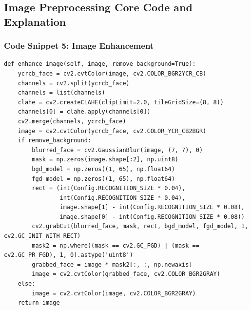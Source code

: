 \documentclass{article}
\begin{document}
\subsection{Image Preprocessing Core Code and Explanation}

\subsubsection{Code Snippet 5: Image Enhancement}
\begin{lstlisting}[basicstyle=\scriptsize\ttfamily, linewidth=\textwidth]
def enhance_image(self, image, remove_background=True):
    ycrcb_face = cv2.cvtColor(image, cv2.COLOR_BGR2YCR_CB)
    channels = cv2.split(ycrcb_face)
    channels = list(channels)
    clahe = cv2.createCLAHE(clipLimit=2.0, tileGridSize=(8, 8))
    channels[0] = clahe.apply(channels[0])
    cv2.merge(channels, ycrcb_face)
    image = cv2.cvtColor(ycrcb_face, cv2.COLOR_YCR_CB2BGR)
    if remove_background:
        blurred_face = cv2.GaussianBlur(image, (7, 7), 0)
        mask = np.zeros(image.shape[:2], np.uint8)
        bgd_model = np.zeros((1, 65), np.float64)
        fgd_model = np.zeros((1, 65), np.float64)
        rect = (int(Config.RECOGNITION_SIZE * 0.04),
                int(Config.RECOGNITION_SIZE * 0.04),
                image.shape[1] - int(Config.RECOGNITION_SIZE * 0.08),
                image.shape[0] - int(Config.RECOGNITION_SIZE * 0.08))
        cv2.grabCut(blurred_face, mask, rect, bgd_model, fgd_model, 1, cv2.GC_INIT_WITH_RECT)
        mask2 = np.where((mask == cv2.GC_FGD) | (mask == cv2.GC_PR_FGD), 1, 0).astype('uint8')
        grabbed_face = image * mask2[:, :, np.newaxis]
        image = cv2.cvtColor(grabbed_face, cv2.COLOR_BGR2GRAY)
    else:
        image = cv2.cvtColor(image, cv2.COLOR_BGR2GRAY)
    return image
\end{lstlisting}
\end{document}
